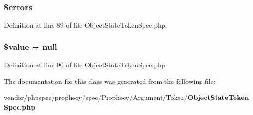 \subsubsection[{\$errors}]{\setlength{\rightskip}{0pt plus 5cm}\$errors}\label{classspec_1_1_prophecy_1_1_argument_1_1_token_1_1_object_state_token_fixture_b_ab24faf4aa647cdcee494fc48524ad4ff}


Definition at line 89 of file Object\+State\+Token\+Spec.\+php.

\subsubsection[{\$value}]{\setlength{\rightskip}{0pt plus 5cm}\$value = null}\label{classspec_1_1_prophecy_1_1_argument_1_1_token_1_1_object_state_token_fixture_b_a0f298096f322952a72a50f98a74c7b60}


Definition at line 90 of file Object\+State\+Token\+Spec.\+php.



The documentation for this class was generated from the following file\+:\begin{DoxyCompactItemize}
\item 
vendor/phpspec/prophecy/spec/\+Prophecy/\+Argument/\+Token/{\bf Object\+State\+Token\+Spec.\+php}\end{DoxyCompactItemize}
